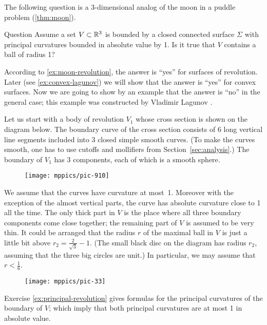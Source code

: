 The following question is a 3-dimensional analog of the moon in a puddle problem (\ref{thm:moon}).

\begin{thm}{Question}\label{quest:lagunov}
Assume a set $V\subset \mathbb{R}^3$ is bounded by a closed connected surface $\Sigma$ with 
principal curvatures bounded in absolute value by 1.
Is it true that $V$ contains a ball of radius 1?
\end{thm}

According to \ref{ex:moon-revolution}, the answer is ``yes'' for surfaces of revolution.
Later (see \ref{ex:convex-lagunov})
we will show that the answer is ``yes'' for convex surfaces.
Now we are going to show by an example that the answer is  ``no'' in the general case;
this example was constructed by Vladimir Lagunov \cite{lagunov-1961}.


Let us start with a body of revolution $V_1$ whose cross section is shown on the diagram below.
The boundary curve of the cross section consists of 6 long vertical line segments included into 3 closed simple smooth curves.
(To make the curves smooth, one has to use cutoffs and mollifiers from Section~\ref{sec:analysis}.)
The boundary of $V_1$ has 3 components, each of which is a smooth sphere.

\begin{wrapfigure}{o}{20 mm}
\vskip-6mm
\centering
\texttt{[image: mppics/pic-910]}
\vskip0mm
\end{wrapfigure}

We assume that the curves have curvature at most~1.
Moreover with the exception of the almost vertical parts, the curve has absolute curvature close to 1 all the time.
The only thick part in $V$ is the place where all three boundary components come close together;
the remaining part of $V$ is assumed to be very thin.
It could be arranged that the radius $r$ of the maximal ball in $V$ is just a little bit above 
$r_2=\tfrac2{\sqrt{3}}-1$.
(The small black disc on the diagram has radius $r_2$,
assuming that the three big circles are unit.)
In particular, we may assume that $r<\tfrac16$.

\begin{figure}[h!]
\centering
\texttt{[image: mppics/pic-33]}
\vskip0mm
\end{figure}

Exercise \ref{ex:principal-revolution} gives formulas for the principal curvatures of the boundary of $V$;
which imply that both principal curvatures are at most 1 in absolute value.  

